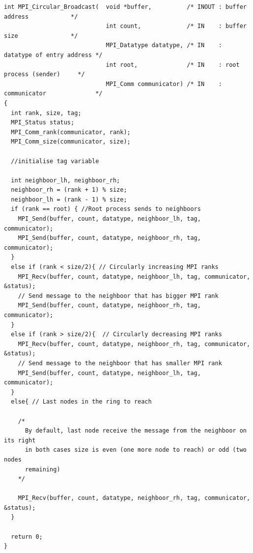 \documentclass[a4paper]{article}
\begin{document}
\begin{verbatim}
int MPI_Circular_Broadcast(  void *buffer,          /* INOUT : buffer address            */
                             int count,             /* IN    : buffer size               */
                             MPI_Datatype datatype, /* IN    : datatype of entry address */
                             int root,              /* IN    : root process (sender)     */
                             MPI_Comm communicator) /* IN    : communicator              */
{
  int rank, size, tag;
  MPI_Status status;
  MPI_Comm_rank(communicator, rank);
  MPI_Comm_size(communicator, size);

  //initialise tag variable

  int neighboor_lh, neighboor_rh;
  neighboor_rh = (rank + 1) % size;
  neighboor_lh = (rank - 1) % size;
  if (rank == root) { //Root process sends to neighboors
    MPI_Send(buffer, count, datatype, neighboor_lh, tag, communicator);
    MPI_Send(buffer, count, datatype, neighboor_rh, tag, communicator);
  }
  else if (rank < size/2){ // Circularly increasing MPI ranks
    MPI_Recv(buffer, count, datatype, neighboor_lh, tag, communicator, &status);
    // Send message to the neighboor that has bigger MPI rank
    MPI_Send(buffer, count, datatype, neighboor_rh, tag, communicator);
  }
  else if (rank > size/2){  // Circularly decreasing MPI ranks
    MPI_Recv(buffer, count, datatype, neighboor_rh, tag, communicator, &status);
    // Send message to the neighboor that has smaller MPI rank
    MPI_Send(buffer, count, datatype, neighboor_lh, tag, communicator);
  }
  else{ // Last nodes in the ring to reach

    /*
      By default, last node receive the message from the neighboor on its right
      in both cases size is even (one more node to reach) or odd (two nodes
      remaining)
    */

    MPI_Recv(buffer, count, datatype, neighboor_rh, tag, communicator, &status);
  }

  return 0;
}
\end{verbatim}
\end{document}
